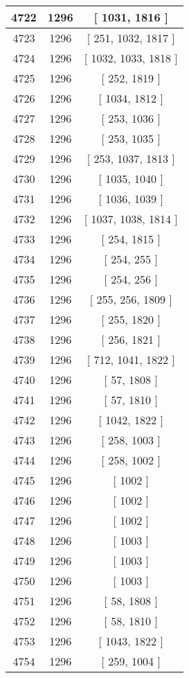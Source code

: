 \begin{center}
\begin{longtable}[H]{|| c c c ||}
\hline
4722 & 1296 & [ 1031, 1816 ] \\ 
\hline
4723 & 1296 & [ 251, 1032, 1817 ] \\ 
\hline
4724 & 1296 & [ 1032, 1033, 1818 ] \\ 
\hline
4725 & 1296 & [ 252, 1819 ] \\ 
\hline
4726 & 1296 & [ 1034, 1812 ] \\ 
\hline
4727 & 1296 & [ 253, 1036 ] \\ 
\hline
4728 & 1296 & [ 253, 1035 ] \\ 
\hline
4729 & 1296 & [ 253, 1037, 1813 ] \\ 
\hline
4730 & 1296 & [ 1035, 1040 ] \\ 
\hline
4731 & 1296 & [ 1036, 1039 ] \\ 
\hline
4732 & 1296 & [ 1037, 1038, 1814 ] \\ 
\hline
4733 & 1296 & [ 254, 1815 ] \\ 
\hline
4734 & 1296 & [ 254, 255 ] \\ 
\hline
4735 & 1296 & [ 254, 256 ] \\ 
\hline
4736 & 1296 & [ 255, 256, 1809 ] \\ 
\hline
4737 & 1296 & [ 255, 1820 ] \\ 
\hline
4738 & 1296 & [ 256, 1821 ] \\ 
\hline
4739 & 1296 & [ 712, 1041, 1822 ] \\ 
\hline
4740 & 1296 & [ 57, 1808 ] \\ 
\hline
4741 & 1296 & [ 57, 1810 ] \\ 
\hline
4742 & 1296 & [ 1042, 1822 ] \\ 
\hline
4743 & 1296 & [ 258, 1003 ] \\ 
\hline
4744 & 1296 & [ 258, 1002 ] \\ 
\hline
4745 & 1296 & [ 1002 ] \\ 
\hline
4746 & 1296 & [ 1002 ] \\ 
\hline
4747 & 1296 & [ 1002 ] \\ 
\hline
4748 & 1296 & [ 1003 ] \\ 
\hline
4749 & 1296 & [ 1003 ] \\ 
\hline
4750 & 1296 & [ 1003 ] \\ 
\hline
4751 & 1296 & [ 58, 1808 ] \\ 
\hline
4752 & 1296 & [ 58, 1810 ] \\ 
\hline
4753 & 1296 & [ 1043, 1822 ] \\ 
\hline
4754 & 1296 & [ 259, 1004 ] \\ 

\end{longtable}
\end{center}
